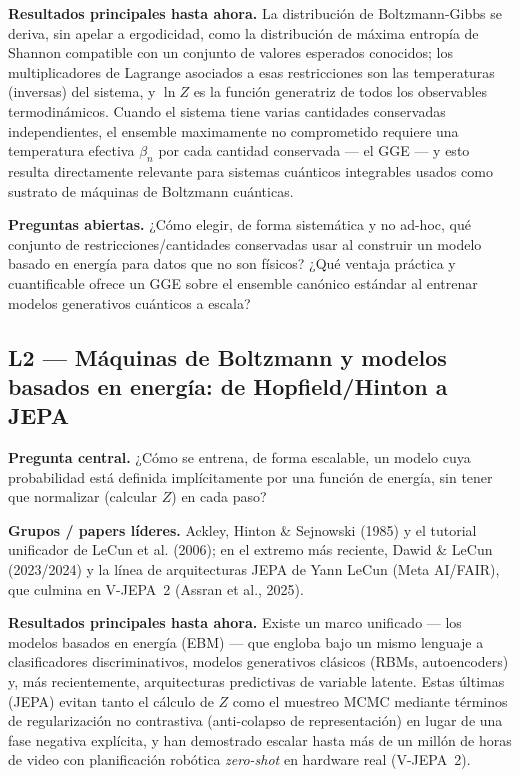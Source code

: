 \documentclass[12pt]{article}
\begin{document}
\textbf{Resultados principales hasta ahora.} La distribución de Boltzmann-Gibbs se deriva, sin apelar a ergodicidad, como la distribución de máxima entropía de Shannon compatible con un conjunto de valores esperados conocidos; los multiplicadores de Lagrange asociados a esas restricciones son las temperaturas (inversas) del sistema, y $\ln Z$ es la función generatriz de todos los observables termodinámicos. Cuando el sistema tiene varias cantidades conservadas independientes, el ensemble maximamente no comprometido requiere una temperatura efectiva $\beta_n$ por cada cantidad conservada --- el GGE --- y esto resulta directamente relevante para sistemas cuánticos integrables usados como sustrato de máquinas de Boltzmann cuánticas.

\textbf{Preguntas abiertas.} ¿Cómo elegir, de forma sistemática y no ad-hoc, qué conjunto de restricciones/cantidades conservadas usar al construir un modelo basado en energía para datos que no son físicos? ¿Qué ventaja práctica y cuantificable ofrece un GGE sobre el ensemble canónico estándar al entrenar modelos generativos cuánticos a escala?

\subsection{L2 --- Máquinas de Boltzmann y modelos basados en energía: de Hopfield/Hinton a JEPA}

\textbf{Pregunta central.} ¿Cómo se entrena, de forma escalable, un modelo cuya probabilidad está definida implícitamente por una función de energía, sin tener que normalizar (calcular $Z$) en cada paso?

\textbf{Grupos / papers líderes.} Ackley, Hinton \& Sejnowski (1985) y el tutorial unificador de LeCun et al. (2006); en el extremo más reciente, Dawid \& LeCun (2023/2024) y la línea de arquitecturas JEPA de Yann LeCun (Meta AI/FAIR), que culmina en V-JEPA~2 (Assran et al., 2025).

\textbf{Resultados principales hasta ahora.} Existe un marco unificado --- los modelos basados en energía (EBM) --- que engloba bajo un mismo lenguaje a clasificadores discriminativos, modelos generativos clásicos (RBMs, autoencoders) y, más recientemente, arquitecturas predictivas de variable latente. Estas últimas (JEPA) evitan tanto el cálculo de $Z$ como el muestreo MCMC mediante términos de regularización no contrastiva (anti-colapso de representación) en lugar de una fase negativa explícita, y han demostrado escalar hasta más de un millón de horas de video con planificación robótica \emph{zero-shot} en hardware real (V-JEPA~2).
\end{document}
